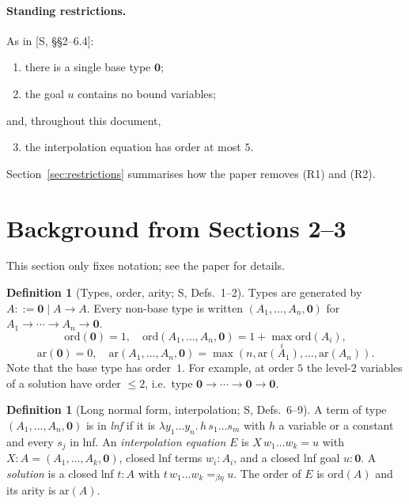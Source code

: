 \documentclass[11pt]{article}
\newcommand{\Ground}{\mathbf{0}}
\newcommand{\ord}{\mathrm{ord}}
\newcommand{\ar}{\mathrm{ar}}
\theoremstyle{plain}
\theoremstyle{definition}
\newtheorem{definition}[theorem]{Definition}
\theoremstyle{remark}
\begin{document}
\paragraph{Standing restrictions.} As in [S, \S\S2--6.4]:
\begin{enumerate}[(R1)]
\item there is a single base type $\Ground$;
\item the goal $u$ contains no bound variables;
\end{enumerate}
and, throughout this document,
\begin{enumerate}[(R1)]\setcounter{enumi}{2}
\item the interpolation equation has order at most $5$.
\end{enumerate}
Section~\ref{sec:restrictions} summarises how the paper removes (R1) and (R2).

\section{Background from Sections 2--3}\label{sec:background}

This section only fixes notation; see the paper for details.

\begin{definition}[Types, order, arity; S, Defs.~1--2]
Types are generated by $A::=\Ground\mid A\to A$.  Every non-base type
is written $(A_1,\dots,A_n,\Ground)$ for $A_1\to\cdots\to A_n\to\Ground$.
\[
\ord(\Ground)=1,\quad \ord(A_1,\dots,A_n,\Ground)=1+\max_i\ord(A_i),
\]
\[
\ar(\Ground)=0,\quad \ar(A_1,\dots,A_n,\Ground)=\max(n,\ar(A_1),\dots,\ar(A_n)).
\]
Note that the base type has order~$1$.  For example, at order $5$ the
level-$2$ variables of a solution have order $\le2$, i.e.\ type
$\Ground\to\cdots\to\Ground\to\Ground$.
\end{definition}

\begin{definition}[Long normal form, interpolation; S, Defs.~6--9]
A term of type $(A_1,\dots,A_n,\Ground)$ is in \emph{lnf} if it is
$\lambda y_1\dots y_n.\,h\,s_1\dots s_m$ with $h$ a variable or a
constant and every $s_j$ in lnf.  An \emph{interpolation equation} $E$
is $X\,w_1\dots w_k=u$ with $X:A=(A_1,\dots,A_k,\Ground)$, closed lnf
terms $w_i:A_i$, and a closed lnf goal $u:\Ground$.  A \emph{solution} is
a closed lnf $t:A$ with $t\,w_1\dots w_k=_{\beta\eta}u$.  The order of
$E$ is $\ord(A)$ and its arity is $\ar(A)$.
\end{definition}
\end{document}
